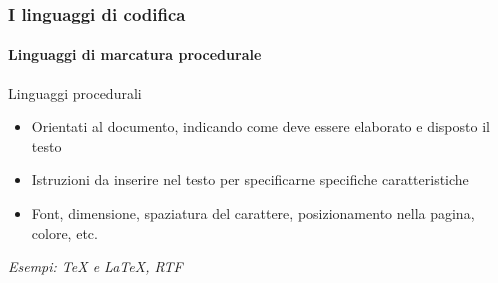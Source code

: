 \documentclass{beamer}
\begin{document}
\begin{frame}
	\frametitle{I linguaggi di codifica}
	\framesubtitle{Linguaggi di marcatura procedurale}
	\addtocounter{nframe}{1}

	\begin{block}{Linguaggi procedurali}
		\begin{itemize}
			\item Orientati al documento, indicando come deve essere elaborato e
			      disposto il testo
			\item Istruzioni da inserire nel testo per specificarne specifiche
			      caratteristiche
			\item Font, dimensione, spaziatura del carattere, posizionamento
			      nella pagina, colore, etc.
		\end{itemize}
	\end{block}

	\textit{Esempi: TeX e LaTeX, RTF}

\end{frame}

\begin{frame}[fragile]
	\frametitle{I linguaggi di codifica}
	\framesubtitle{Linguaggi di marcatura procedurale}
	\addtocounter{nframe}{1}

	\defverbatim{\rtf}{%
		\begin{tiny}
			\begin{verbatim}

 	{\rtf1\ansi\deff0\adeflang1025
 	{\fonttbl{\f0\froman\fprq2\fcharset0 Times New Roman;}
 	{\f1\froman\fprq2\fcharset0 Times New Roman;}
 	{\f2\fnil\fprq2\fcharset0 Lucida Sans Unicode;}
 	{\colortbl;\red0\green0\blue0;\red128\green128\blue128;}
 	{\stylesheet{\s1\cf0{\*\hyphen2\hyphlead2\hyphtrail2\hyphmax0}
 	\rtlch\af5\afs24\lang255\ltrch\dbch\af2\afs24\langfe255
 	\loch\f0\fs24\lang1040\snext1 Standard;}

        \end{verbatim}
		\end{tiny}
	}

	\begin{block}{Esempio RTF}
		{\rtf}
	\end{block}

\end{frame}
\end{document}
